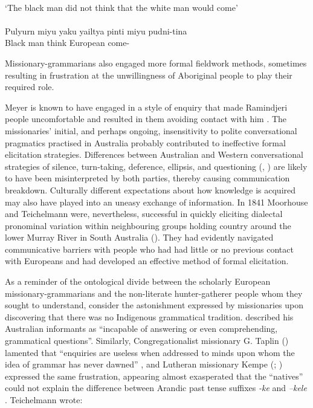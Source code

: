 \ea
{} \\
{`The black man did not think that the white man would come'} \\
\citep[69]{teichelmann_outlines_1840} \\
\gll Pulyurn miyu yaku yailtya {pinti miyu} pudni-tina\\
Black man  think European come-\\
\z

Missionary-grammarians also engaged more formal fieldwork methods, sometimes resulting in frustration at the unwillingness of Aboriginal people to play their required role. 

Meyer is known to have engaged in a style of enquiry that made Ramindjeri people uncomfortable and resulted in them avoiding contact with him \citep[66--74]{gale_nothing_2011}. The missionaries’ initial, and perhaps ongoing, insensitivity to polite conversational pragmatics practised in Australia probably contributed to ineffective formal elicitation strategies. Differences between Australian and Western conversational strategies of silence, turn-taking, deference, ellipsis, and questioning (\citealt{Walsh_1997}, \citealt{BlytheMushininpress}) are likely to have been misinterpreted by both parties, thereby causing communication breakdown. Culturally different expectations about how knowledge is acquired \citep{Eades1982} may also have played into an uneasy exchange of information. In 1841 Moorhouse and Teichelmann were, nevertheless, successful in quickly eliciting dialectal pronominal variation within neighbouring groups holding country around the lower Murray River in South Australia (). They had evidently navigated communicative barriers with people who had had little or no previous contact with Europeans and had developed an effective method of formal elicitation.

As a reminder of the ontological divide between the scholarly European mis\-sion\-ary-grammarians and the non-literate hunter-gatherer people whom they sought to understand, consider the astonishment expressed by missionaries upon discovering that there was no Indigenous grammatical tradition. \citet[v]{meyer_vocabulary_1843} described his Australian informants as “incapable of answering or even comprehending, grammatical questions”. Similarly, Congregationalist missionary G. Taplin () lamented that “enquiries are useless when addressed to minds upon whom the idea of grammar has never dawned” \citeyearpar[6]{taplin_grammar_1880}, and Lutheran missionary Kempe (\citeyear[4]{kempe_grammar_1891}; ) expressed the same frustration, appearing almost exasperated that the “natives” could not explain the difference between Arandic past tense suffixes \textit{-ke} and \textit{–kele} \citeyearpar[1]{kempe_grammar_1891}. Teichelmann wrote:

